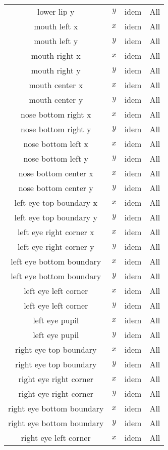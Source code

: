 \begin{table}[h]
\begin{tabular}{|c|c|c|c|}
      lower lip y & $y$ & idem & All \\
      mouth left x & $x$ & idem & All \\
      mouth left y & $y$ & idem & All \\
      mouth right x & $x$ & idem & All \\
      mouth right y & $y$ & idem & All \\
      mouth center x & $x$ & idem & All \\
      mouth center y & $y$ & idem & All \\
      nose bottom right x & $x$ & idem & All \\
      nose bottom right y & $y$ & idem & All \\
      nose bottom left x & $x$ & idem & All \\
      nose bottom left y & $y$ & idem & All \\
      nose bottom center x & $x$ & idem & All \\
      nose bottom center y & $y$ & idem & All \\
      left eye top boundary x & $x$ & idem & All \\
      left eye top boundary y & $y$ & idem & All \\
      left eye right corner x & $x$ & idem & All \\
      left eye right corner y & $y$ & idem & All \\
      left eye bottom boundary & $x$ & idem & All \\
      left eye bottom boundary  & $y$ & idem & All \\
      left eye left corner    & $x$ & idem & All \\
      left eye left corner	& $y$ & idem & All \\
      left eye pupil          & $x$ & idem & All \\
      left eye pupil            & $y$ & idem & All \\
      right eye top boundary & $x$ & idem & All \\
      right eye top boundary   & $y$ & idem & All \\
      right eye right corner & $x$ & idem & All \\
      right eye right corner  & $y$ & idem & All \\
      right eye bottom boundary & $x$ & idem & All \\
      right eye bottom boundary & $y$ & idem & All \\
      right eye left corner    & $x$ & idem & All \\

\end{tabular}
\end{table}
